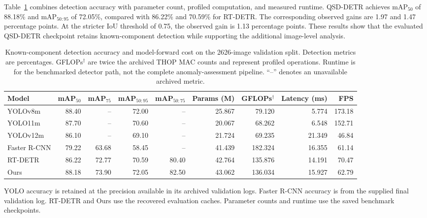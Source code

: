 Table~\ref{tab:detection_complexity} combines detection accuracy with
parameter count, profiled computation, and measured runtime. QSD-DETR
achieves mAP$_{50}$ of 88.18\% and mAP$_{50:95}$ of 72.05\%, compared with
86.22\% and 70.59\% for RT-DETR. The corresponding observed gains are 1.97
and 1.47 percentage points. At the stricter IoU threshold of 0.75, the
observed gain is 1.13 percentage points. These results show that the evaluated
QSD-DETR checkpoint retains known-component detection while supporting the
additional image-level analysis.

\begin{table}[!t]
  \centering
  \caption{Known-component detection accuracy and model-forward cost on the
  2626-image validation split. Detection metrics are percentages.
  GFLOPs$^\dagger$ are twice the archived THOP MAC counts and represent
  profiled operations. Runtime is for the benchmarked detector path, not the
  complete anomaly-assessment pipeline. ``--'' denotes an unavailable
  archived metric.}
  \label{tab:detection_complexity}
  {\QSDexpTableStyle
  \begin{tabular*}{\textwidth}{@{\extracolsep{\fill}}lrrrrrrrr@{}}
    \toprule
    Model & mAP$_{50}$ & mAP$_{75}$ & mAP$_{50:95}$ & mAP$_{50:75}$
    & Params (M) & GFLOPs$^\dagger$ & Latency (ms) & FPS \\
    \midrule
    YOLOv8m      & 88.40 & --    & 72.00 & --    & 25.867 & 79.120  & 5.774  & 173.18 \\
    YOLO11m      & 87.70 & --    & 70.60 & --    & 20.067 & 68.262  & 6.548  & 152.71 \\
    YOLOv12m     & 86.10 & --    & 69.10 & --    & 21.724 & 69.235  & 21.349 & 46.84 \\
    Faster R-CNN & 79.22 & 63.68 & 58.45 & --    & 41.439 & 182.324 & 16.355 & 61.14 \\
    RT-DETR      & 86.22 & 72.77 & 70.59 & 80.40 & 42.764 & 135.876 & 14.191 & 70.47 \\
    Ours         & 88.18 & 73.90 & 72.05 & 82.50 & 43.062 & 136.034 & 15.927 & 62.79 \\
    \bottomrule
  \end{tabular*}\par
  \smallskip
  \parbox{\textwidth}{YOLO accuracy is retained at the precision available in
  its archived validation logs. Faster R-CNN accuracy is from the supplied
  final validation log. RT-DETR and Ours use the recovered evaluation caches.
  Parameter counts and runtime use the saved benchmark checkpoints.}
  }
\end{table}

